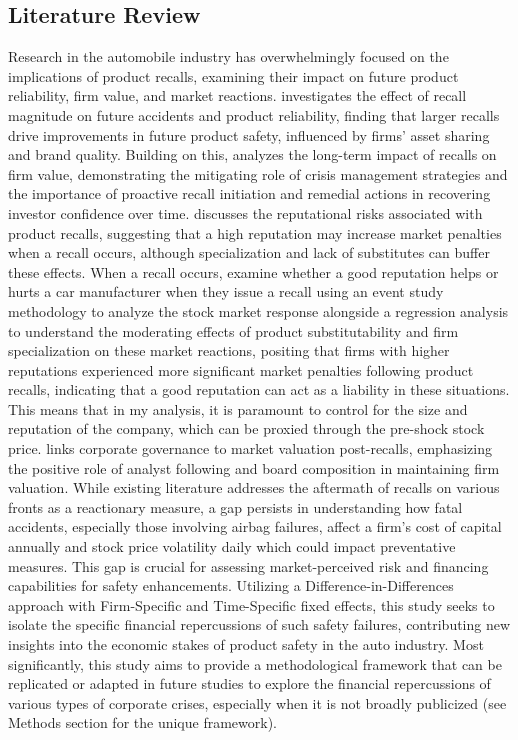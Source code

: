 \documentclass[12pt,a4paper]{article}
\begin{document}
\subsection{Literature Review}
    \hspace{1cm} Research in the automobile industry has overwhelmingly focused on the implications of product recalls, examining their impact on future product reliability, firm value, and market reactions. \cite{Kalaignanam2013Impact} investigates the effect of recall magnitude on future accidents and product reliability, finding that larger recalls drive improvements in future product safety, influenced by firms' asset sharing and brand quality. Building on this, \cite{Liu2017CrisisManagement} analyzes the long-term impact of recalls on firm value, demonstrating the mitigating role of crisis management strategies and the importance of proactive recall initiation and remedial actions in recovering investor confidence over time. \cite{Rhee2006LiabilityGoodReputation} discusses the reputational risks associated with product recalls, suggesting that a high reputation may increase market penalties when a recall occurs, although specialization and lack of substitutes can buffer these effects. When a recall occurs, \cite{RheeHaunschild2006} examine whether a good reputation helps or hurts a car manufacturer when they  issue a recall using an event study methodology to analyze the stock market response alongside a regression analysis to understand the moderating effects of product substitutability and firm specialization on these market reactions, positing that firms with higher reputations experienced more significant market penalties following product recalls, indicating that a good reputation can act as a liability in these situations.  This means that in my analysis, it is paramount to control for the size and reputation of the company, which can be proxied through the pre-shock stock price. \cite{Chung2003CorporateGovernance} links corporate governance to market valuation post-recalls, emphasizing the positive role of analyst following and board composition in maintaining firm valuation. While existing literature addresses the aftermath of recalls on various fronts as a reactionary measure, a gap persists in understanding how fatal accidents, especially those involving airbag failures, affect a firm’s cost of capital annually and stock price volatility daily which could impact preventative measures. This gap is crucial for assessing market-perceived risk and financing capabilities for safety enhancements. Utilizing a Difference-in-Differences approach with Firm-Specific and Time-Specific fixed effects, this study seeks to isolate the specific financial repercussions of such safety failures, contributing new insights into the economic stakes of product safety in the auto industry. Most significantly, this study aims to provide a methodological framework that can be replicated or adapted in future studies to explore the financial repercussions of various types of corporate crises, especially when it is not broadly publicized (see Methods section for the unique framework). 
    
\end{document}
